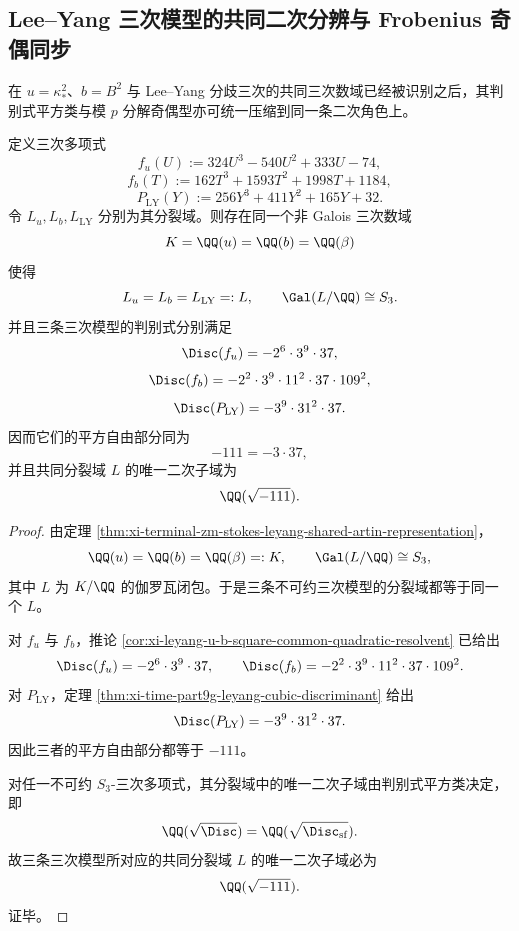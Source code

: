 \subsection{Lee--Yang 三次模型的共同二次分辨与 Frobenius 奇偶同步}

在 \(u=\kappa_*^2\)、\(b=B^2\) 与 Lee--Yang 分歧三次的共同三次数域已经被识别之后，其判别式平方类与模 \(p\) 分解奇偶型亦可统一压缩到同一条二次角色上。

\begin{theorem}\label{thm:derived-leyang-cubic-models-common-quadratic-resolvent}
定义三次多项式
\[
f_u(U):=324U^3-540U^2+333U-74,
\]
\[
f_b(T):=162T^3+1593T^2+1998T+1184,
\]
\[
P_{\mathrm{LY}}(Y):=256Y^3+411Y^2+165Y+32.
\]
令 \(L_u,L_b,L_{\mathrm{LY}}\) 分别为其分裂域。则存在同一个非 Galois 三次数域
\[
K=\QQ(u)=\QQ(b)=\QQ(\beta)
\]
使得
\[
L_u=L_b=L_{\mathrm{LY}}=:L,
\qquad
\Gal(L/\QQ)\cong S_3.
\]
并且三条三次模型的判别式分别满足
\[
\Disc(f_u)=-2^6\cdot 3^9\cdot 37,
\]
\[
\Disc(f_b)=-2^2\cdot 3^9\cdot 11^2\cdot 37\cdot 109^2,
\]
\[
\Disc(P_{\mathrm{LY}})=-3^9\cdot 31^2\cdot 37.
\]
因而它们的平方自由部分同为
\[
-111=-3\cdot 37,
\]
并且共同分裂域 \(L\) 的唯一二次子域为
\[
\QQ(\sqrt{-111}).
\]
\end{theorem}
\begin{proof}
由定理 \ref{thm:xi-terminal-zm-stokes-leyang-shared-artin-representation}，
\[
\QQ(u)=\QQ(b)=\QQ(\beta)=:K,
\qquad
\Gal(L/\QQ)\cong S_3,
\]
其中 \(L\) 为 \(K/\QQ\) 的伽罗瓦闭包。于是三条不可约三次模型的分裂域都等于同一个 \(L\)。

对 \(f_u\) 与 \(f_b\)，推论 \ref{cor:xi-leyang-u-b-square-common-quadratic-resolvent} 已给出
\[
\Disc(f_u)=-2^6\cdot 3^9\cdot 37,
\qquad
\Disc(f_b)=-2^2\cdot 3^9\cdot 11^2\cdot 37\cdot 109^2.
\]
对 \(P_{\mathrm{LY}}\)，定理 \ref{thm:xi-time-part9g-leyang-cubic-discriminant} 给出
\[
\Disc(P_{\mathrm{LY}})=-3^9\cdot 31^2\cdot 37.
\]
因此三者的平方自由部分都等于 \(-111\)。

对任一不可约 \(S_3\)-三次多项式，其分裂域中的唯一二次子域由判别式平方类决定，即
\[
\QQ(\sqrt{\Disc})=\QQ(\sqrt{\Disc_{\mathrm{sf}}}).
\]
故三条三次模型所对应的共同分裂域 \(L\) 的唯一二次子域必为
\[
\QQ(\sqrt{-111}).
\]
证毕。
\end{proof}

